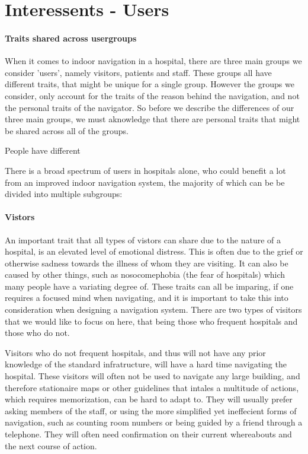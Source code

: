 \section{Interessents - Users} %
\label{sec:interusers}


\paragraph{Traits shared across usergroups}

When it comes to indoor navigation in a hospital, there are three main groups we consider 'users', namely visitors, patients and staff. These groups all have different traits, that might be unique for a single group. However the groups we consider, only account for the traits of the reason behind the navigation, and not the personal traits of the navigator. So before we describe the differences of our three main groups, we must aknowledge that there are personal traits that might be shared across all of the groups.

People have different




There is a broad spectrum of users in hospitals alone, who could benefit a lot from an improved indoor navigation system, the majority of which can be be divided into multiple subgroups:

\paragraph{Vistors} %
 \label{par:vistors}
 

An important trait that all types of vistors can share due to the nature of a hospital, is an elevated level of emotional distress. This is often due to the grief or otherwise sadness towards the illness of whom they are visiting. It can also be caused by other things, such as nosocomephobia (the fear of hospitals) which many people have a variating degree of. These traits can all be imparing, if one requires a focused mind when navigating, and it is important to take this into consideration when designing a navigation system. There are two types of visitors that we would like to focus on here, that being those who frequent hospitals and those who do not.

Visitors who do not frequent hospitals, and thus will not have any prior knowledge of the standard infratructure, will have a hard time navigating the hospital. These visitors will often not be used to navigate any large building, and therefore stationaire maps or other guidelines that intales a multitude of actions, which requires memorization, can be hard to adapt to. They will usually prefer asking members of the staff, or using the more simplified yet ineffecient forms of navigation, such as counting room numbers or being guided by a friend through a telephone. They will often need confirmation on their current whereabouts and the next course of action.

